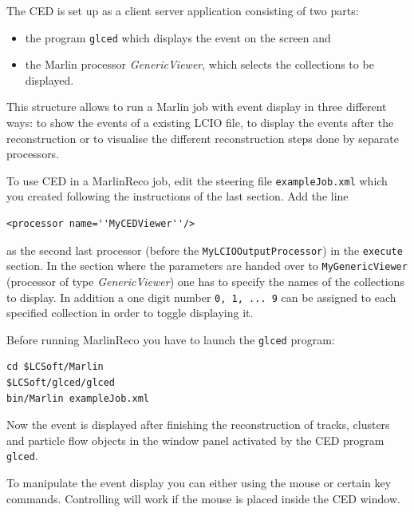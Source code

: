 The CED is set up as a client server application consisting of two 
parts: 
\begin{itemize}
\item the program {\tt glced} which displays the event on the screen and 
\item the Marlin processor {\em GenericViewer}, which selects the collections 
      to be displayed.
\end{itemize}
This structure allows to run a Marlin job with event display in three
different ways: to show the events of a existing LCIO file, 
to display the events after the reconstruction or to visualise the 
different reconstruction steps done by separate processors. 

To use CED in a MarlinReco job, edit the steering file {\tt exampleJob.xml}
which you created following the instructions of the last section. 
Add the line 

\begin{verbatim}
<processor name=''MyCEDViewer''/>
\end{verbatim}

as the second last processor (before the {\tt MyLCIOOutputProcessor})
in the {\tt execute} section. In the section 
where the parameters are handed over to {\tt MyGenericViewer} 
(processor of type {\em GenericViewer}) one has to specify the 
names of the collections to display. In addition a one digit number 
{\tt 0, 1, ... 9} can be assigned to each specified collection 
in order to toggle displaying it. 

Before running MarlinReco you have to launch the {\tt glced} program:

\begin{verbatim}
cd $LCSoft/Marlin
$LCSoft/glced/glced
bin/Marlin exampleJob.xml
\end{verbatim}

Now the event is displayed after finishing the reconstruction of 
tracks, clusters and particle flow objects in the window panel activated by 
the CED program {\tt glced}.

To manipulate the event display you can either using the mouse or 
certain key commands. Controlling will work if the mouse is placed
inside the CED window. 

